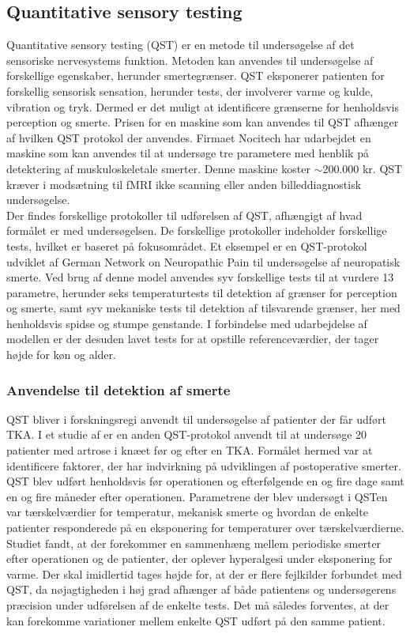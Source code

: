 \subsection{Quantitative sensory testing}
Quantitative sensory testing (QST) er en metode til undersøgelse af det sensoriske nervesystems funktion. Metoden kan anvendes til undersøgelse af forskellige egenskaber, herunder smertegrænser. QST eksponerer patienten for forskellig sensorisk sensation, herunder tests, der involverer varme og kulde, vibration og tryk. Dermed er det muligt at identificere grænserne for henholdsvis perception og smerte. \citep{Yarnitsky2006} Prisen for en maskine som kan anvendes til QST afhænger af hvilken QST protokol der anvendes. Firmaet Nocitech har udarbejdet en maskine som kan anvendes til at undersøge tre parametere med henblik på detektering af muskuloskeletale smerter. Denne maskine koster $\sim$200.000 kr. \citep{NociTech2016} QST kræver i modsætning til fMRI ikke scanning eller anden billeddiagnostisk undersøgelse. \\
Der findes forskellige protokoller til udførelsen af QST, afhængigt af hvad formålet er med undersøgelsen. De forskellige protokoller indeholder forskellige tests, hvilket er baseret på fokusområdet. Et eksempel er en QST-protokol udviklet af German Network on Neuropathic Pain til undersøgelse af neuropatisk smerte. Ved brug af denne model anvendes syv forskellige tests til at vurdere 13 parametre, herunder seks temperaturtests til detektion af grænser for perception og smerte, samt syv mekaniske tests til detektion af tilsvarende grænser, her med henholdsvis spidse og stumpe genstande. I forbindelse med udarbejdelse af modellen er der desuden lavet tests for at opstille referenceværdier, der tager højde for køn og alder. \citep{Rolke2006}  

\subsubsection{Anvendelse til detektion af smerte}
QST bliver i forskningsregi anvendt til undersøgelse af patienter der får udført TKA. I et studie af \citep{Martinez2007} er en anden QST-protokol anvendt til at undersøge 20 patienter med artrose i knæet før og efter en TKA. Formålet hermed var at identificere faktorer, der har indvirkning på udviklingen af postoperative smerter. QST blev udført henholdsvis før operationen og efterfølgende en og fire dage samt en og fire måneder efter operationen. Parametrene der blev undersøgt i QSTen var tærskelværdier for temperatur, mekanisk smerte og hvordan de enkelte patienter responderede på en eksponering for temperaturer over tærskelværdierne. Studiet fandt, at der forekommer en sammenhæng mellem periodiske smerter efter operationen og de patienter, der oplever hyperalgesi under eksponering for varme. \citep{Martinez2007} Der skal imidlertid tages højde for, at der er flere fejlkilder forbundet med QST, da nøjagtigheden i høj grad afhænger af både patientens og undersøgerens præcision under udførelsen af de enkelte tests. Det må således forventes, at der kan forekomme variationer mellem enkelte QST udført på den samme patient. \citep{Yarnitsky2006}

